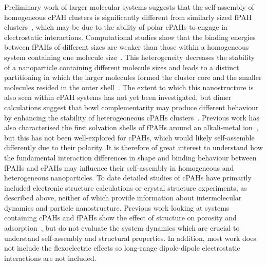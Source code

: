 Preliminary work of larger molecular systems suggests that the self-assembly of homogeneous cPAH clusters is significantly different from similarly sized fPAH clusters~\cite{bowal2019ion}, which may be due to the ability of polar cPAHs to engage in electrostatic interactions. Computational studies show that the binding energies between fPAHs of different sizes are weaker than those within a homogeneous system containing one molecule size~\cite{Rapacioli2005stacked}. This heterogeneity decreases the stability of a nanoparticle containing different molecule sizes and leads to a distinct partitioning in which the larger molecules formed the cluster core and the smaller molecules resided in the outer shell~\cite{bowal2018partitioning}. The extent to which this nanostructure is also seen within cPAH systems has not yet been investigated, but dimer calculations suggest that bowl complementarity may produce different behaviour by enhancing the stability of heterogeoneous cPAHs clusters~\cite{Cabaleiro-Lago2018}. Previous work has also characterised the first solvation shells of fPAHs around an alkali-metal ion~\cite{bartolomei2019aggregation,bowal2019ion,Chen2016a}, but this has not been well-explored for cPAHs, which would likely self-assemble differently due to their polarity. It is therefore of great interest to understand how the fundamental interaction differences in shape and binding behaviour between fPAHs and cPAHs may influence their self-assembly in homogeneous and heterogeneous nanoparticles. To date detailed studies of cPAHs have primarily included electronic structure calculations or crystal structure experiments, as described above, neither of which provide information about intermolecular dynamics and particle nanostructure.
Previous work looking at systems containing cPAHs and fPAHs show the effect of structure on porosity and adsorption~\cite{zhang2020molecular,demir2016adsorption}, but do not evaluate the system dynamics which are crucial to understand self-assembly and structural properties. In addition, most work does not include the flexoelectric effects so long-range dipole-dipole electrostatic interactions are not included.
%

